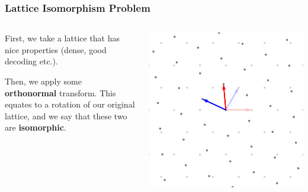 \documentclass[
aspectratio=169, %
t, %
onlytextwidth, %
10pt, %
]{beamer}
\begin{document}
\begin{frame}
    \frametitle{Lattice Isomorphism Problem}
    \begin{columns}[T]
        \begin{column}{0.48\linewidth}
            First, we take a lattice that has nice properties (dense, good decoding etc.).

            Then, we apply some \textbf{orthonormal} transform. This equates to a rotation of our original lattice, and we say that these two are \textbf{isomorphic}.

        \end{column}
        \begin{column}{0.48\linewidth}
            \includegraphics[width=\linewidth]{a2_rotated_basis.png}
        \end{column}
    \end{columns}
\end{frame}

\end{document}
